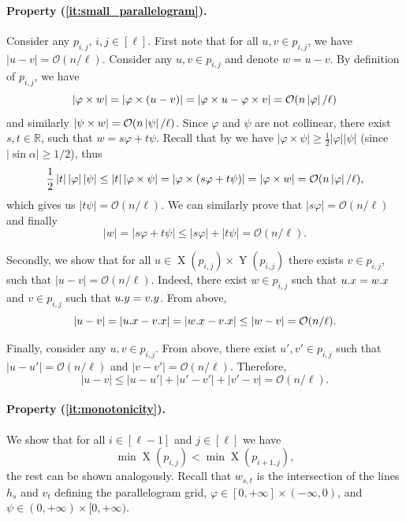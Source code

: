 \documentclass[twoside,leqno]{article}
\renewcommand{\O}{\mathcal{O}}
\renewcommand{\phi}{\varphi}
\DeclareMathOperator*{\X}{X}
\DeclareMathOperator*{\Y}{Y}
\newcommand{\absolute}[1]{\left\lvert#1\right\rvert}
\begin{document}
\paragraph*{Property (\ref{it:small_parallelogram}).}
Consider any $p_{i,j}$, $i,j \in [\ell]$. First note that	for all $u, v \in p_{i, j}$, we have $\absolute{u - v} = \O(n / \ell)$. Consider any $u, v \in p_{i, j}$ and denote $w = u - v$.
By definition of $p_{i, j}$, we have
\[ \absolute{\h{w}} = \absolute{\h{(u - v)}} = \absolute{\h{u} - \h{v}} = \O(n\absolute{\phi} / \ell) \]
and similarly $\absolute{\s{w}} = \O(n\absolute{\psi} / \ell)$. Since $\phi$ and $\psi$ are not collinear, there exist $s, t \in \mathbb{R}$, such that $w = s\phi + t\psi$. Recall that by  we have $\absolute{\phi \times \psi} \ge \frac{1}{2}\absolute{\phi}\absolute{\psi}$ (since $\absolute{\sin \alpha} \ge 1/2$), thus
\[ \frac{1}{2}\absolute{t}\absolute{\phi}\absolute{\psi} \le \absolute{t}\absolute{\phi \times \psi} = \absolute{\phi \times (s\phi + t\psi)} = \absolute{\h{w}} = \O(n\absolute{\phi} / \ell), \]
which gives us $\absolute{t\psi} = \O(n / \ell)$. We can similarly prove that $\absolute{s\phi} = \O(n / \ell)$ and finally 
\[ \absolute{w} = \absolute{s\phi + t\psi} \le \absolute{s\phi} + \absolute{t\psi} = \O(n / \ell). \]

Secondly, we show that	for all $u \in \X(p_{i, j}) \times \Y(p_{i, j})$ there exists $v \in p_{i, j}$, such that $\absolute{u - v} = \O(n / \ell)$. Indeed, there exist $w \in p_{i, j}$ such that $u.x = w.x$ and $v \in p_{i, j}$ such that $u.y = v.y$. From above, 
\[\absolute{u - v} = \absolute{\x{u} - \x{v}} = \absolute{\x{w} - \x{v}} \le \absolute{w - v} = \O(n / \ell).\] 

Finally, consider any $u, v \in p_{i, j}$. From above, there exist $u', v' \in p_{i, j}$ such that $\absolute{u - u'} = \O(n / \ell)$ and $\absolute{v - v'} = \O(n / \ell)$. Therefore, 
\[ \absolute{u - v} \le \absolute{u - u'} + \absolute{u' - v'} + \absolute{v' - v} = \O(n / \ell). \]

\paragraph*{Property (\ref{it:monotonicity}).} 
We show that for all $i \in [\ell - 1]$ and $j \in [\ell]$ we have
$$\min \X(p_{i, j}) < \min \X(p_{i + 1, j}),$$
the rest can be shown analogously. Recall that $w_{s,t}$ is the intersection of the lines $h_s$ and $v_t$ defining the parallelogram grid, $\phi \in [0, +\infty] \times (-\infty,0)$, and $\psi \in (0,+\infty) \times [0,+\infty)$. 
\end{document}
